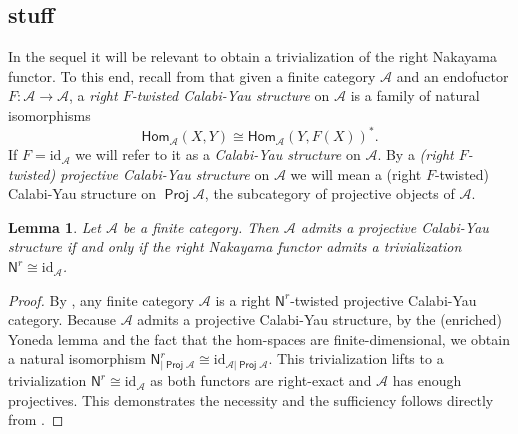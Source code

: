 \documentclass[11pt]{article}
\newcommand{\N}{\mathbb{N}}
\newcommand{\Hom}{\mathrm{Hom}}
\newcommand{\cA}{\mathcal{A}}
\newtheorem{lemma}[theorem]{Lemma}
\theoremstyle{definition}
\begin{document}
\subsection{stuff}





In the sequel it will be relevant to obtain a trivialization of the right Nakayama functor. To this end, recall from \cite{tracesw} that given a finite category $\mathcal{A}$ and an endofuctor $F: \mathcal{A} \longrightarrow \mathcal{A}$, a \emph{right $F$-twisted Calabi-Yau structure} on $\mathcal{A}$ is a family of natural isomorphisms $$ \mathsf{Hom}_{\mathcal{A}}(X,Y) \cong \mathsf{Hom}_\mathcal{A} (Y, F(X))^*.  $$
If $F= \mathrm{id}_\mathcal{A}$ we will refer to it as a \emph{Calabi-Yau structure} on $\mathcal{A}$. By a \emph{(right $F$-twisted) projective Calabi-Yau structure} on $\mathcal{A}$ we will mean a  (right $F$-twisted) Calabi-Yau structure on $\operatorname{\mathsf{Proj}} \mathcal{A}$, the subcategory of projective objects of $\mathcal{A}$.





\begin{lemma}\label{lem:trivializ_on_ProjA}
Let $\mathcal{A}$ be a finite category. Then $\mathcal{A}$ admits a projective Calabi-Yau structure if and only if the right Nakayama functor admits a trivialization $\mathsf{N}^r \cong \mathrm{id}_\mathcal{A}$.
\end{lemma}
\begin{proof}
By \cite[Corollary 2.3]{tracesw}, any finite category $\mathcal{A}$ is a right $\mathsf{N}^r$-twisted projective Calabi-Yau category. Because $\mathcal{A}$ admits a projective Calabi-Yau structure, by the (enriched) Yoneda lemma and the fact that the hom-spaces are finite-dimensional, we obtain a natural isomorphism $\mathsf{N}^r_{|\operatorname{\mathsf{Proj}} \mathcal{A}} \cong \mathrm{id}_{\mathcal{A}| \operatorname{\mathsf{Proj}} \mathcal{A}}$. This trivialization lifts to a trivialization $\mathsf{N}^r \cong \mathrm{id}_\mathcal{A}$ as both functors are right-exact and  $\mathcal{A}$ has enough projectives. This demonstrates the necessity and the sufficiency follows directly from \cite[Corollary 2.3]{tracesw}.
\end{proof}
\end{document}
